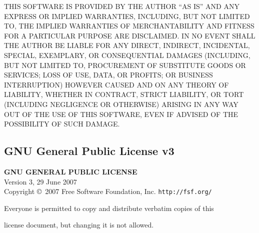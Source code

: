 \documentclass[10pt]{article}
\begin{document}
THIS SOFTWARE IS PROVIDED BY THE AUTHOR ``AS IS'' AND ANY EXPRESS OR
IMPLIED WARRANTIES, INCLUDING, BUT NOT LIMITED TO, THE IMPLIED WARRANTIES
OF MERCHANTABILITY AND FITNESS FOR A PARTICULAR PURPOSE ARE DISCLAIMED.
IN NO EVENT SHALL THE AUTHOR BE LIABLE FOR ANY DIRECT, INDIRECT,
INCIDENTAL, SPECIAL, EXEMPLARY, OR CONSEQUENTIAL DAMAGES (INCLUDING, BUT
NOT LIMITED TO, PROCUREMENT OF SUBSTITUTE GOODS OR SERVICES; LOSS OF USE,
DATA, OR PROFITS; OR BUSINESS INTERRUPTION) HOWEVER CAUSED AND ON ANY
THEORY OF LIABILITY, WHETHER IN CONTRACT, STRICT LIABILITY, OR TORT
(INCLUDING NEGLIGENCE OR OTHERWISE) ARISING IN ANY WAY OUT OF THE USE OF
THIS SOFTWARE, EVEN IF ADVISED OF THE POSSIBILITY OF SUCH DAMAGE.

\clearpage
\subsection{GNU General Public License v3}
\begin{center}
{\parindent 0in
\textbf{GNU GENERAL PUBLIC LICENSE}\\
Version 3, 29 June 2007 \\

Copyright \copyright\  2007 Free Software Foundation, Inc. \texttt{http://fsf.org/}

\bigskip
Everyone is permitted to copy and distribute verbatim copies of this

license document, but changing it is not allowed.}

\end{center}
\end{document}
